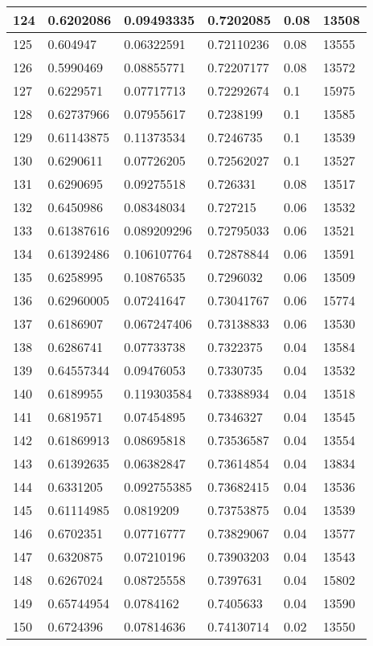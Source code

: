 \begin{longtable}{|l|l|l|l|l|l|}
124 & 0.6202086 & 0.09493335 & 0.7202085 & 0.08 & 13508 \\ \hline 
125 & 0.604947 & 0.06322591 & 0.72110236 & 0.08 & 13555 \\ \hline 
126 & 0.5990469 & 0.08855771 & 0.72207177 & 0.08 & 13572 \\ \hline 
127 & 0.6229571 & 0.07717713 & 0.72292674 & 0.1 & 15975 \\ \hline 
128 & 0.62737966 & 0.07955617 & 0.7238199 & 0.1 & 13585 \\ \hline 
129 & 0.61143875 & 0.11373534 & 0.7246735 & 0.1 & 13539 \\ \hline 
130 & 0.6290611 & 0.07726205 & 0.72562027 & 0.1 & 13527 \\ \hline 
131 & 0.6290695 & 0.09275518 & 0.726331 & 0.08 & 13517 \\ \hline 
132 & 0.6450986 & 0.08348034 & 0.727215 & 0.06 & 13532 \\ \hline 
133 & 0.61387616 & 0.089209296 & 0.72795033 & 0.06 & 13521 \\ \hline 
134 & 0.61392486 & 0.106107764 & 0.72878844 & 0.06 & 13591 \\ \hline 
135 & 0.6258995 & 0.10876535 & 0.7296032 & 0.06 & 13509 \\ \hline 
136 & 0.62960005 & 0.07241647 & 0.73041767 & 0.06 & 15774 \\ \hline 
137 & 0.6186907 & 0.067247406 & 0.73138833 & 0.06 & 13530 \\ \hline 
138 & 0.6286741 & 0.07733738 & 0.7322375 & 0.04 & 13584 \\ \hline 
139 & 0.64557344 & 0.09476053 & 0.7330735 & 0.04 & 13532 \\ \hline 
140 & 0.6189955 & 0.119303584 & 0.73388934 & 0.04 & 13518 \\ \hline 
141 & 0.6819571 & 0.07454895 & 0.7346327 & 0.04 & 13545 \\ \hline 
142 & 0.61869913 & 0.08695818 & 0.73536587 & 0.04 & 13554 \\ \hline 
143 & 0.61392635 & 0.06382847 & 0.73614854 & 0.04 & 13834 \\ \hline 
144 & 0.6331205 & 0.092755385 & 0.73682415 & 0.04 & 13536 \\ \hline 
145 & 0.61114985 & 0.0819209 & 0.73753875 & 0.04 & 13539 \\ \hline 
146 & 0.6702351 & 0.07716777 & 0.73829067 & 0.04 & 13577 \\ \hline 
147 & 0.6320875 & 0.07210196 & 0.73903203 & 0.04 & 13543 \\ \hline 
148 & 0.6267024 & 0.08725558 & 0.7397631 & 0.04 & 15802 \\ \hline 
149 & 0.65744954 & 0.0784162 & 0.7405633 & 0.04 & 13590 \\ \hline 
150 & 0.6724396 & 0.07814636 & 0.74130714 & 0.02 & 13550 \\ \hline 
\end{longtable}